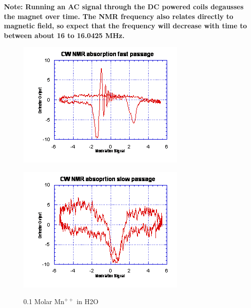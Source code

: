 \documentclass{../lab}
\begin{document}
\begin{enumerate}
    \textbf{Note: Running an AC signal through the DC powered coils degausses the magnet over time. The NMR frequency also relates directly to magnetic field, so expect that the frequency will decrease with time to between about 16 to 16.0425 MHz.}

    \begin{figure}[h]
    \begin{minipage}[t]{0.32\textwidth}
        \href{http://experimentationlab.berkeley.edu/sites/default/files/images/NMR21.gif}{\includegraphics[width=0.95\linewidth,keepaspectratio]{images/NMR21.png}}
        \caption{0.1 Molar Mn$^{++}$ in H2O}
        \label{fig:TenthMolarMn}
    \end{minipage}\hfill
    \begin{minipage}[t]{0.32\textwidth}
        \href{http://experimentationlab.berkeley.edu/sites/default/files/images/NMR22.gif}{\includegraphics[width=\linewidth,keepaspectratio]{images/NMR22.png}}

\end{minipage}
\end{figure}
\end{enumerate}
\end{document}
